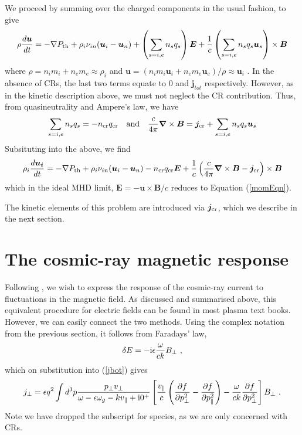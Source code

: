\documentclass[a4paper,fleqn,usenatbib]{mnras}
\newcommand{\eqb}{\begin{eqnarray}}
\newcommand{\eqe}{\end{eqnarray}}
\begin{document}
We proceed by summing over the charged components in the usual fashion, to give
\eqb
\rho \frac{d\bm{u}}{dt} = -\nabla P_{\rm th} +  \rho_i \nu_{in}(\bm{u}_i-\bm{u}_n)+\left(\sum_{s=i,e}n_s q_s\right)\bm{E} + \frac{1}{c}\left(\sum_{s=i,e}n_s q_s \bm{u}_s\right)\times \bm{B} 
\eqe
where $\rho = n_i m_i + n_e m_e \approx \rho_i$ and $\bm{u} = (n_i m_i \bm{u}_i+ n_e m_e \bm{u}_e)/\rho \approx  \bm{u}_i$ . In the absence of CRs, the last two terms equate to $0$ and $\bm{j}_{tot}$ respectively. However, as in the kinetic description above, we must not neglect the CR contribution. Thus, from quasineutrality and Ampere's law, we have
\eqb
\sum_{s=i,e}n_s q_s = -n_{\rm cr} q_{\rm cr} \mbox{~~~and~~~}
 \frac{c}{4 \pi} \bm{\nabla}\times \bm{B} = \bm{j}_{\rm cr}+\sum_{s=i,e}n_s q_s \bm{u}_s 
 \eqe
Subsituting into the above, we find
\eqb
\rho_i \frac{d\bm{u_i}}{dt} = -\nabla P_{\rm th} +  \rho_i \nu_{in}(\bm{u}_i-\bm{u}_n) - n_{\rm cr} q_{\rm cr} \bm{E} + \frac{1}{c}\left(  \frac{c}{4 \pi} \bm{\nabla}\times \bm{B} - \bm{j}_{\rm cr} \right)\times \bm{B} 
\eqe
which in the ideal MHD limit, $\bm{E} = -\bm{u}\times\bm{B}/c$ reduces to Equation (\ref{momEqn}). 

The kinetic elements of this problem are introduced via $\bm{j}_{\rm cr}$, which we describe in the next section.


\section{The cosmic-ray magnetic response}

Following \cite{Bell04}, we wish to express the response of the cosmic-ray current to fluctuations in the magnetic field. As discussed and summarised above, this equivalent procedure for electric fields can be found in most plasma text books. However, we can easily connect the two methods.
Using the complex notation from the previous section, it follows from Faradays' law, 
\eqb
\delta E = -{\rm i}\epsilon \frac{\omega}{ck}  B_\bot~,
\eqe
which on substitution into (\ref{jbot}) gives
\begin{equation*}
j_\bot = \epsilon q^2\int d^3 p \frac{p_\bot v_\bot}{\omega - \epsilon\omega_g - k v_\| + {\rm i}0^+}
\left[ \frac{v_\|}{c}\left(\frac{\partial f}{\partial p_\bot^2}-\frac{\partial f}{\partial p_\|^2}\right)
-\frac{\omega}{ck}\frac{\partial f}{\partial p_\bot^2}\right] B_\bot~.
\end{equation*}
Note we have dropped the subscript for species, as we are only concerned with CRs.
\end{document}
